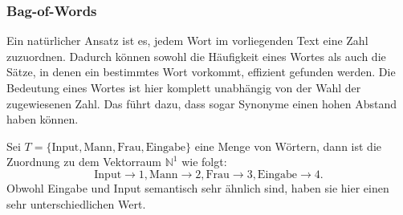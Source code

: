 \documentclass[12pt,letterpaper,ngerman]{article}
\begin{document}
\subsubsection{Bag-of-Words}
Ein natürlicher Ansatz ist es, jedem Wort im vorliegenden Text eine Zahl 
zuzuordnen. Dadurch können sowohl die Häufigkeit eines Wortes als auch
die Sätze, in denen ein bestimmtes Wort vorkommt, effizient gefunden 
werden. Die Bedeutung eines Wortes ist hier komplett unabhängig von 
der Wahl der zugewiesenen Zahl. Das führt dazu, dass sogar Synonyme einen
hohen Abstand haben können.
\pagebreak
\begin{example}
  Sei $T = \{\text{Input}, \text{Mann}, \text{Frau},
   \text{Eingabe}\}$ eine Menge von Wörtern, dann ist die Zuordnung
  zu dem Vektorraum $\mathbb{N}^1$ wie folgt:
  \[
    \text{Input} \to 1, 
    \text{Mann} \to 2, 
    \text{Frau} \to 3,
    \text{Eingabe} \to 4.
  \]
  Obwohl Eingabe und Input semantisch sehr ähnlich sind, haben sie hier
  einen sehr unterschiedlichen Wert.
\end{example}
\end{document}
